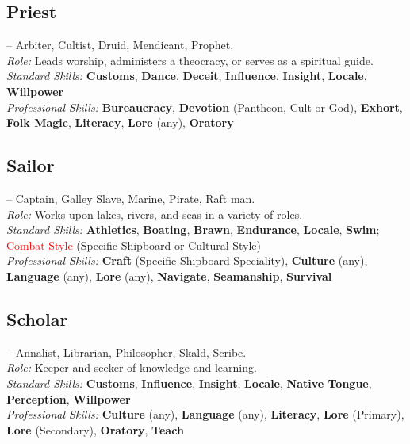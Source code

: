 \documentclass[10pt]{article}
\newcommand{\skill}[1]{\textbf{#1}}
\begin{document}
\vspace{0.2cm}
\subsection*{Priest}
\label{career:priest}
 -- Arbiter, Cultist, Druid, Mendicant, Prophet.\\
\textit{Role:} Leads worship, administers a theocracy, or serves as a spiritual guide.\\
\textit{Standard Skills:} \skill{Customs}, \skill{Dance}, \skill{Deceit}, \skill{Influence}, \skill{Insight}, \skill{Locale}, \skill{Willpower}\\
\textit{Professional Skills:} \skill{Bureaucracy}, \skill{Devotion} (Pantheon, Cult or God), \skill{Exhort}, \skill{Folk Magic}, \skill{Literacy}, \skill{Lore} (any), \skill{Oratory}

\vspace{0.2cm}
\subsection*{Sailor}
\label{career:sailor}
 -- Captain, Galley Slave, Marine, Pirate, Raft man.\\
\textit{Role:} Works upon lakes, rivers, and seas in a variety of roles.\\
\textit{Standard Skills:} \skill{Athletics}, \skill{Boating}, \skill{Brawn}, \skill{Endurance}, \skill{Locale}, \skill{Swim}; \textcolor{red}{Combat Style} (Specific Shipboard or Cultural Style)\\
\textit{Professional Skills:} \skill{Craft} (Specific Shipboard Speciality), \skill{Culture} (any), \skill{Language} (any), \skill{Lore} (any), \skill{Navigate}, \skill{Seamanship}, \skill{Survival}

\vspace{0.2cm}
\subsection*{Scholar}
\label{career:scholar}
 -- Annalist, Librarian, Philosopher, Skald, Scribe.\\
\textit{Role:} Keeper and seeker of knowledge and learning.\\
\textit{Standard Skills:} \skill{Customs}, \skill{Influence}, \skill{Insight}, \skill{Locale}, \skill{Native Tongue}, \skill{Perception}, \skill{Willpower}\\
\textit{Professional Skills:} \skill{Culture} (any), \skill{Language} (any), \skill{Literacy}, \skill{Lore} (Primary), \skill{Lore} (Secondary), \skill{Oratory}, \skill{Teach}
\end{document}
